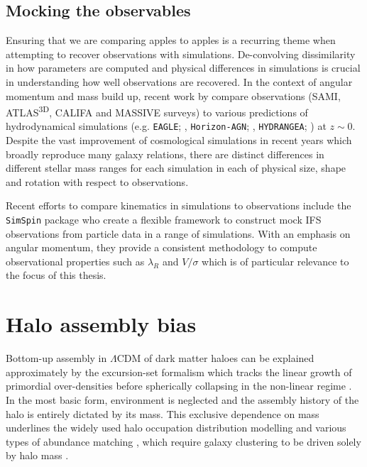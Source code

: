 \subsection{Mocking the observables}
Ensuring that we are comparing apples to apples is a recurring theme when attempting to recover observations with simulations. De-convolving dissimilarity in how parameters are computed and physical differences in simulations is crucial in understanding how well observations are recovered. In the context of angular momentum and mass build up, recent work by \citet{sande2019} compare observations (SAMI, ATLAS\textsuperscript{3D}, CALIFA and MASSIVE surveys) to various predictions of hydrodynamical simulations (e.g. \texttt{EAGLE}; \citet{schaye2015}, \texttt{Horizon-AGN}; \citet{dubois2014}, \texttt{HYDRANGEA}; \citet{bahe2017}) at $z \sim 0$. Despite the vast improvement of cosmological simulations in recent years which broadly reproduce many galaxy relations, there are distinct differences in different stellar mass ranges for each simulation in each of physical size, shape and rotation with respect to observations.

Recent efforts to compare kinematics in simulations to observations include the \texttt{SimSpin} package \citep{harborne2019, harborne2020} who create a flexible framework to construct mock IFS observations from particle data in a range of simulations. With an emphasis on angular momentum, they provide a consistent methodology to compute observational properties such as $\lambda_R$ and $V/\sigma$ which is of particular relevance to the focus of this thesis.


\section{Halo assembly bias} \label{sec:halo_assembly_bias_intro}
Bottom-up assembly in $\Lambda$CDM of dark matter haloes can be explained approximately by the excursion-set formalism which tracks the linear growth of primordial over-densities before spherically collapsing in the non-linear regime \citep{press1974,bond1991}. In the most basic form, environment is neglected and the assembly history of the halo is entirely dictated by its mass. This exclusive dependence on mass underlines the widely used halo occupation distribution \citep[HOD; e.g.][]{jing1998,peacock2000} modelling and various types of abundance matching \citep[e.g.][]{kravtsov2004,conroy2006}, which require galaxy clustering to be driven solely by halo mass \citep[e.g.][]{mo1996,sheth1999}. 

